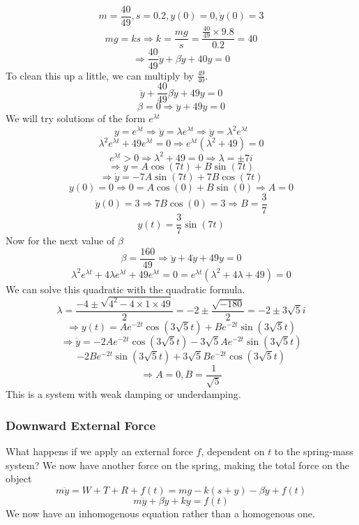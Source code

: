 \documentclass[12pt]{report}
\begin{document}
\begin{flushleft}
\begin{center}
    \[m = \frac{40}{49}, s = 0.2, y(0) = 0, \dot{y}(0) = 3\]
    \[mg = ks \Rightarrow k = \frac{mg}{s} 
    = \frac{\frac{40}{49} \times 9.8}{0.2} = 40\]
    \[\Rightarrow \frac{40}{49}\ddot{y} + \beta\dot{y} + 40y = 0\]
    To clean this up a little, we can multiply by \(\frac{49}{40}\).
    \[\ddot{y} + \frac{40}{49}\beta\dot{y} + 49y = 0\]
    \[\beta = 0 \Rightarrow \ddot{y} + 49y = 0\]
    We will try solutions of the form \(e^{\lambda t}\)
    \[y = e^{\lambda t} \Rightarrow \dot{y} = \lambda e^{\lambda t}
    \Rightarrow \ddot{y} = \lambda^2e^{\lambda t}\]
    \[\lambda^2e^{\lambda t} + 49e^{\lambda t} = 0 \Rightarrow
    e^{\lambda t}(\lambda^2 + 49) = 0\]
    \[e^{\lambda t} > 0 \Rightarrow \lambda^2 + 49 = 0 \Rightarrow \lambda
    = \pm 7i\]
    \[\Rightarrow y = A\cos(7t) + B\sin(7t)\]
    \[\Rightarrow \dot{y} = -7A\sin(7t) + 7B\cos(7t)\]
    \[y(0) = 0 \Rightarrow 0 = A\cos(0) + B\sin(0) \Rightarrow A = 0\]
    \[\dot{y}(0) = 3 \Rightarrow 7B\cos(0) = 3 \Rightarrow B = \frac{3}{7}\]
    \[y(t) = \frac{3}{7}\sin(7t)\]
    Now for the next value of \(\beta\)
    \[\beta = \frac{160}{49} \Rightarrow \ddot{y} + 4\dot{y} + 49y = 0\]
    \[\lambda^2e^{\lambda t} + 4\lambda e^{\lambda t} + 49e^{\lambda t} = 0
    = e^{\lambda t}(\lambda^2 + 4\lambda + 49) = 0\]
    We can solve this quadratic with the quadratic formula.
    \[\lambda = \frac{-4 \pm \sqrt{4^2 - 4\times 1 \times49}}{2}
    = -2 \pm \frac{\sqrt{-180}}{2} = -2 \pm 3\sqrt{5}i\]
    \[\Rightarrow y(t) = Ae^{-2t}\cos(3\sqrt{5}t) + Be^{-2t}\sin(3\sqrt{5}t)\]
    \[\Rightarrow \dot{y} = -2Ae^{-2t}\cos(3\sqrt{5}t) 
    - 3\sqrt{5}Ae^{-2t}\sin(3\sqrt{5}t)\]
    \[- 2Be^{-2t}\sin(3\sqrt{5}t) + 3\sqrt{5}Be^{-2t}\cos(3\sqrt{5}t)\]
    \[\Rightarrow A = 0, B = \frac{1}{\sqrt{5}}\]
    This is a system with weak damping or underdamping.
\end{center}

\subsubsection*{Downward External Force}

What happens if we apply an external force \(f\), dependent on \(t\) to the
spring-mass system? We now have another force on the spring, making the total
force on the object
\[m\ddot{y} = W + T + R + f(t) = mg -k(s + y) -\beta\dot{y} + f(t)\]
\[m\ddot{y} + \beta\dot{y} + ky = f(t)\]
We now have an inhomogenous equation rather than a homogenous one.


\end{flushleft}
\end{document}
